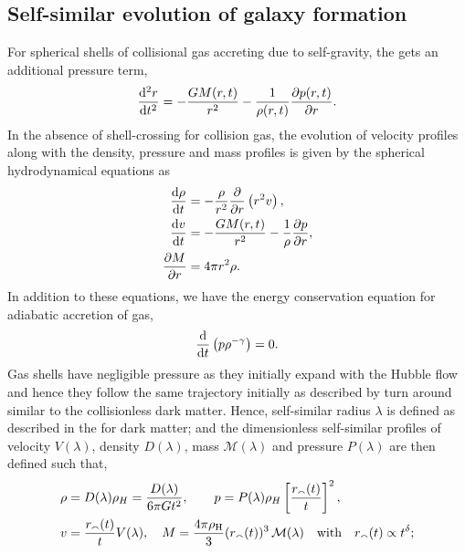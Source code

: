 \subsection{Self-similar evolution of galaxy formation}
For spherical shells of collisional gas accreting due to self-gravity, the  gets an additional pressure term,
\begin{align}
\label{eq:gas_traj_phys_accl}
\frac{{\rm d}^2 r}{{\rm d} t^2} = - \frac{GM(r,t)}{r^2} -\frac{1}{\rho(r,t) }\frac{\partial p(r,t)}{\partial r}.
\end{align}
In the absence of shell-crossing for collision gas, the evolution of velocity profiles along with the density, pressure and mass profiles is given by the spherical hydrodynamical equations \cite{1985Bertschinger} as
\begin{align}
\label{eq:sph_hydro_cont}
\frac{{\rm d}\rho }{{\rm d}t} &= -\frac{\rho }{r^2}\frac{\mathrm{\partial} }{\mathrm{\partial} r} \left( r^2v \right) , \\
\label{eq:sph_hydro_accl}
\frac{{\rm d}v}{{\rm d}t} &= - \frac{GM(r,t)}{r^2} -\frac{1}{\rho }\frac{\partial p}{\mathrm{\partial} r}, \\
\label{eq:sph_hydro_mass_cons}
\frac{\mathrm{\partial} M}{\mathrm{\partial} r} &= 4\pi r^2 \rho.
\end{align}
In addition to these equations, we have the energy conservation equation for adiabatic accretion of gas, 
\begin{align}
\label{eq:sph_hydro_adiab}
\frac{{\rm d}}{{\rm d}t}\left( p \rho ^{-\gamma } \right) = 0.
\end{align}
Gas shells have negligible pressure as they initially expand with the Hubble flow and hence they follow the same trajectory initially as described by  turn around similar to the collisionless dark matter. Hence, self-similar radius $\lambda$ is defined as described in the  for dark matter; and the dimensionless self-similar profiles of velocity $V(\lambda)$, density $D(\lambda)$, mass $\mathcal{M}(\lambda)$ and pressure $P(\lambda)$ are then defined such that,
\begin{align*}
\rho &= D(\lambda ) \rho_H = \frac{D(\lambda )}{6 \pi G t^2}, \qquad
p = P(\lambda ) \rho_H \left[ \frac{r_{\smallfrown}(t)}{t} \right]^2,\\
v &= \frac{r_{\smallfrown}(t)}{t} V(\lambda ), \quad M = \frac{4\pi \rho _{\rm H}}{3} (r_{\smallfrown}(t))^3\,\mathcal{M}(\lambda)\quad  \text{with} \quad r_{\smallfrown}(t) \propto t^{\delta};
\end{align*}

